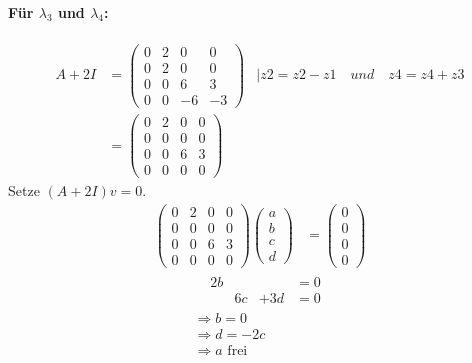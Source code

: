 \documentclass{article} %
\begin{document}
\paragraph{Für $\lambda_3$ und $\lambda_4$:}
\begin{align*}
     A +2I &  = \begin{pmatrix}
    0 & 2 & 0 & 0 \\ 
    0 & 2 & 0 & 0\\
    0 & 0 & 6  & 3 \\
    0 & 0 & -6 & -3
    \end{pmatrix} & \mid z2 = z2-z1 \quad und \quad z4 = z4+z3 \\ 
    &  = \begin{pmatrix}
    0 & 2 & 0 & 0 \\ 
    0 & 0 & 0 & 0\\
    0 & 0 & 6  & 3 \\
    0 & 0 & 0 & 0
    \end{pmatrix}
\end{align*}
    Setze $(A +2 I)v = 0$.
\begin{align*}
       \begin{pmatrix}
     0 & 2 & 0 & 0 \\ 
    0 & 0 & 0 & 0\\
    0 & 0 & 6  & 3 \\
    0 & 0 & 0 & 0
    \end{pmatrix} \begin{pmatrix}
       a \\ b \\ c \\ d 
    \end{pmatrix} & = \begin{pmatrix}
       0 \\ 0 \\0 \\ 0
    \end{pmatrix}  
     \end{align*}
     \begin{align*}
         \begin{array}{cccccc}
             & 2b &  &  & =0\\
    &  & 6c  & +3d & = 0 
         \end{array} \\
         \Rightarrow b = 0\\
         \Rightarrow d = -2c \\
          \Rightarrow a \text{ frei}
     \end{align*}
\end{document}
